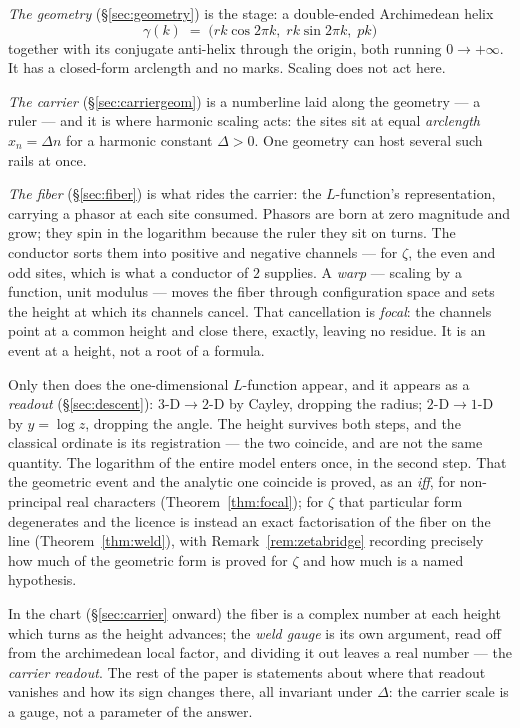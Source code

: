 \documentclass[11pt]{article}
\theoremstyle{plain}
\theoremstyle{definition}
\theoremstyle{remark}
\begin{document}
\emph{The geometry} (\S\ref{sec:geometry}) is the stage: a double-ended Archimedean
helix
\[
  \gamma(k)\;=\;\bigl(rk\cos2\pi k,\;rk\sin2\pi k,\;pk\bigr)
\]
together with its conjugate anti-helix through the origin, both running
$0\to+\infty$. It has a closed-form arclength and no marks. Scaling does not act here.

\emph{The carrier} (\S\ref{sec:carriergeom}) is a numberline laid along the geometry
--- a ruler --- and it is where harmonic scaling acts: the sites sit at equal
\emph{arclength} $x_n=\Delta n$ for a harmonic constant $\Delta>0$. One geometry can
host several such rails at once.

\emph{The fiber} (\S\ref{sec:fiber}) is what rides the carrier: the $L$-function's
representation, carrying a phasor at each site consumed. Phasors are born at zero
magnitude and grow; they spin in the logarithm because the ruler they sit on turns.
The conductor sorts them into positive and negative channels --- for $\zeta$, the even
and odd sites, which is what a conductor of $2$ supplies. A \emph{warp} --- scaling by
a function, unit modulus --- moves the fiber through configuration space and sets the
height at which its channels cancel. That cancellation is \emph{focal}: the channels
point at a common height and close there, exactly, leaving no residue. It is an event
at a height, not a root of a formula.

Only then does the one-dimensional $L$-function appear, and it appears as a
\emph{readout} (\S\ref{sec:descent}): $3\text{-D}\to2\text{-D}$ by Cayley, dropping the
radius; $2\text{-D}\to1\text{-D}$ by $y=\log z$, dropping the angle. The height
survives both steps, and the classical ordinate is its registration --- the two
coincide, and are not the same quantity. The logarithm of the entire model enters once,
in the second step. That the geometric event and the analytic one coincide is proved,
as an \emph{iff}, for non-principal real characters (Theorem~\ref{thm:focal}); for
$\zeta$ that particular form degenerates and the licence is instead an exact
factorisation of the fiber on the line (Theorem~\ref{thm:weld}), with
Remark~\ref{rem:zetabridge} recording precisely how much of the geometric form is
proved for $\zeta$ and how much is a named hypothesis.

In the chart (\S\ref{sec:carrier} onward) the fiber is a complex number at each height
which turns as the height advances; the \emph{weld gauge} is its own argument, read off
from the archimedean local factor, and dividing it out leaves a real number --- the
\emph{carrier readout}. The rest of the paper is statements about where that readout
vanishes and how its sign changes there, all invariant under $\Delta$: the carrier
scale is a gauge, not a parameter of the answer.
\end{document}
